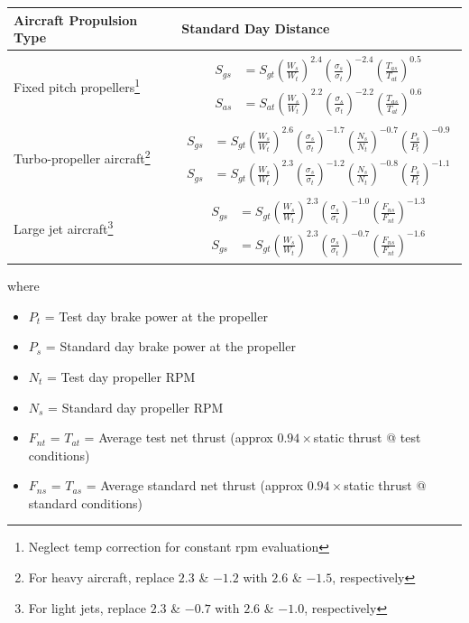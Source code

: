 \documentclass[
]{book}
\providecommand{\tightlist}{%
  \setlength{\itemsep}{0pt}\setlength{\parskip}{0pt}}
\begin{document}
\begin{longtable}[]{@{}ll@{}}
\toprule
\textbf{Aircraft Propulsion Type} & \textbf{Standard Day Distance}\tabularnewline
\midrule
\endhead
Fixed pitch propellers\footnote{Neglect temp correction for constant rpm evaluation} & \begin{align} S_{gs} &= S_{gt} \left( \frac{W_s}{W_t} \right)^{2.4} \left( \frac{\sigma_s}{\sigma_t} \right)^{-2.4} \left( \frac{T_{as}}{T_{at}} \right)^{0.5} \\ S_{as} &= S_{at} \left( \frac{W_s}{W_t} \right)^{2.2} \left( \frac{\sigma_s}{\sigma_t} \right)^{-2.2} \left( \frac{T_{as}}{T_{at}} \right)^{0.6} \end{align}\tabularnewline
Turbo-propeller aircraft\footnote{For heavy aircraft, replace \(2.3\) \& \(-1.2\) with \(2.6\) \& \(-1.5\), respectively} & \begin{align} S_{gs} &= S_{gt} \left( \frac{W_s}{W_t} \right)^{2.6} \left( \frac{\sigma_s}{\sigma_t} \right)^{-1.7} \left( \frac{N_s}{N_t} \right)^{-0.7} \left( \frac{P_s}{P_t} \right)^{-0.9} \\ S_{gs} &= S_{gt} \left( \frac{W_s}{W_t} \right)^{2.3} \left( \frac{\sigma_s}{\sigma_t} \right)^{-1.2} \left( \frac{N_s}{N_t} \right)^{-0.8} \left( \frac{P_s}{P_t} \right)^{-1.1} \end{align}\tabularnewline
Large jet aircraft\footnote{For light jets, replace \(2.3\) \& \(-0.7\) with \(2.6\) \& \(-1.0\), respectively} & \begin{align} S_{gs} &= S_{gt} \left( \frac{W_s}{W_t} \right)^{2.3} \left( \frac{\sigma_s}{\sigma_t} \right)^{-1.0} \left( \frac{F_{ns}}{F_{nt}} \right)^{-1.3}  \\ S_{gs} &= S_{gt} \left( \frac{W_s}{W_t} \right)^{2.3} \left( \frac{\sigma_s}{\sigma_t} \right)^{-0.7} \left( \frac{F_{ns}}{F_{nt}} \right)^{-1.6} \end{align}\tabularnewline
\bottomrule
\end{longtable}

where

\begin{itemize}
\tightlist
\item
  \(P_t\) = Test day brake power at the propeller
\item
  \(P_s\) = Standard day brake power at the propeller
\item
  \(N_t\) = Test day propeller \(\text{RPM}\)
\item
  \(N_s\) = Standard day propeller \(\text{RPM}\)
\item
  \(F_{nt}\) = \(T_{at}\) = Average test net thrust (approx \(0.94 \times\)static thrust @ test conditions)
\item
  \(F_{ns}\) = \(T_{as}\) = Average standard net thrust (approx \(0.94 \times\)static thrust @ standard conditions)
\end{itemize}
\end{document}
